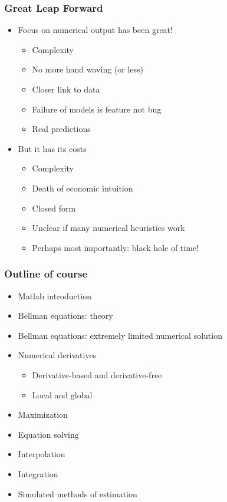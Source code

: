 \documentclass{beamer}
\begin{document}
\begin{frame}
\frametitle[alignment=center]{Great Leap Forward}
\begin{itemize}
\item Focus on numerical output has been great!
\bigskip
\begin{itemize}
\item Complexity 
\bigskip
\item No more hand waving (or less)
\bigskip
\item Closer link to data
\bigskip
\item Failure of models is feature not bug
\bigskip
\item Real predictions
\bigskip
\end{itemize}
\item But it has its costs
\bigskip
\begin{itemize}
\item Complexity 
\bigskip
\item Death of economic intuition
\bigskip
\item Closed form
\bigskip
\item Unclear if many numerical heuristics work
\bigskip
\item Perhaps most importantly: black hole of time!
\end{itemize}
\end{itemize}
\end{frame}

\begin{frame}
\frametitle[alignment=center]{Outline of course}
\begin{itemize}
\item Matlab introduction
\bigskip
\item Bellman equations: theory
\bigskip
\item Bellman equations: extremely limited numerical solution
\bigskip
\item Numerical derivatives
\bigskip
\begin{itemize}
\item Derivative-based and derivative-free
\bigskip
\item Local and global
\bigskip
\end{itemize}
\item Maximization
\bigskip
\item Equation solving
\bigskip
\item Interpolation
\bigskip
\item Integration
\bigskip
\item Simulated methods of estimation
\end{itemize}
\end{frame}
\end{document}
